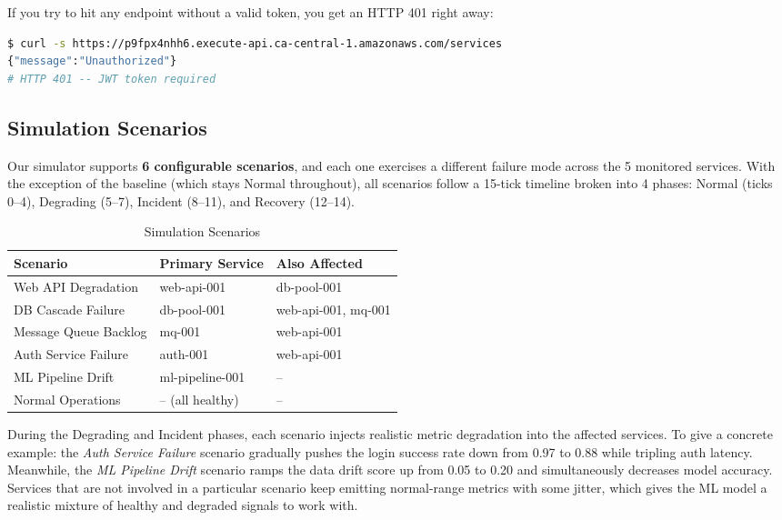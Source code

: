 \documentclass[11pt,a4paper]{article}
\begin{document}
If you try to hit any endpoint without a valid token, you get an HTTP 401 right away:

\begin{lstlisting}[language=bash, caption={JWT Authorization verification}]
$ curl -s https://p9fpx4nhh6.execute-api.ca-central-1.amazonaws.com/services
{"message":"Unauthorized"}
# HTTP 401 -- JWT token required
\end{lstlisting}

\subsection{Simulation Scenarios}

Our simulator supports \textbf{6 configurable scenarios}, and each one exercises a different failure mode across the 5 monitored services. With the exception of the baseline (which stays Normal throughout), all scenarios follow a 15-tick timeline broken into 4 phases: Normal (ticks 0--4), Degrading (5--7), Incident (8--11), and Recovery (12--14).

\begin{table}[H]
\centering
\begin{tabular}{lll}
\toprule
\textbf{Scenario} & \textbf{Primary Service} & \textbf{Also Affected} \\
\midrule
Web API Degradation & web-api-001 & db-pool-001 \\
DB Cascade Failure & db-pool-001 & web-api-001, mq-001 \\
Message Queue Backlog & mq-001 & web-api-001 \\
Auth Service Failure & auth-001 & web-api-001 \\
ML Pipeline Drift & ml-pipeline-001 & -- \\
Normal Operations & -- (all healthy) & -- \\
\bottomrule
\end{tabular}
\caption{Simulation Scenarios}
\label{tab:scenarios}
\end{table}

During the Degrading and Incident phases, each scenario injects realistic metric degradation into the affected services. To give a concrete example: the \textit{Auth Service Failure} scenario gradually pushes the login success rate down from 0.97 to 0.88 while tripling auth latency. Meanwhile, the \textit{ML Pipeline Drift} scenario ramps the data drift score up from 0.05 to 0.20 and simultaneously decreases model accuracy. Services that are not involved in a particular scenario keep emitting normal-range metrics with some jitter, which gives the ML model a realistic mixture of healthy and degraded signals to work with.
\end{document}
